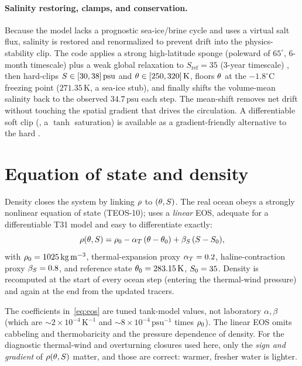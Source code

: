 \paragraph{Salinity restoring, clamps, and conservation.}
Because the model lacks a prognostic sea-ice/brine cycle and uses a
virtual salt flux, salinity is restored and renormalized to prevent drift
into the physics-stability clip. The code applies a strong high-latitude
sponge (poleward of $65^\circ$, $6$-month timescale) plus a weak global
relaxation to $S_{\mathrm{ref}}=35$ ($3$-year timescale) \citep{haney1971}, then hard-clips
$S\in[30,38]\,\mathrm{psu}$ and $\theta\in[250,320]\,\mathrm{K}$, floors
$\theta$ at the $-1.8^\circ\mathrm{C}$ freezing point ($271.35\,\mathrm{K}$,
a sea-ice stub), and finally shifts the volume-mean salinity back to the
observed $34.7\,\mathrm{psu}$ each step. The mean-shift removes net drift
without touching the spatial gradient that drives the circulation. A
differentiable soft clip (, a $\tanh$ saturation) is
available as a gradient-friendly alternative to the hard .

\section{Equation of state and density}

Density closes the system by linking $\rho$ to $(\theta,S)$. The real
ocean obeys a strongly nonlinear equation of state (TEOS-10); \model{} uses
a \emph{linear} EOS, adequate for a differentiable T31 model and easy to
differentiate exactly:
\begin{equation}
  \rho(\theta,S)
   = \rho_0 - \alpha_T\,(\theta-\theta_0) + \beta_S\,(S-S_0),
  \label{eq:eos}
\end{equation}
with $\rho_0=1025\,\mathrm{kg\,m^{-3}}$, thermal-expansion proxy
$\alpha_T=0.2$, haline-contraction proxy $\beta_S=0.8$, and reference state
$\theta_0=283.15\,\mathrm{K}$, $S_0=35$. Density is recomputed at the
start of every ocean step (entering the thermal-wind pressure) and again at
the end from the updated tracers.

\begin{remark}
The coefficients in~\eqref{eq:eos} are tuned tank-model values, not
laboratory $\alpha,\beta$ (which are $\sim\!2\times10^{-4}\,\mathrm{K^{-1}}$
and $\sim\!8\times10^{-4}\,\mathrm{psu^{-1}}$ times $\rho_0$). The linear
EOS omits cabbeling and thermobaricity and the pressure dependence of
density. For the diagnostic thermal-wind and overturning closures used here,
only the \emph{sign and gradient} of $\rho(\theta,S)$ matter, and those
are correct: warmer, fresher water is lighter.
\end{remark}

